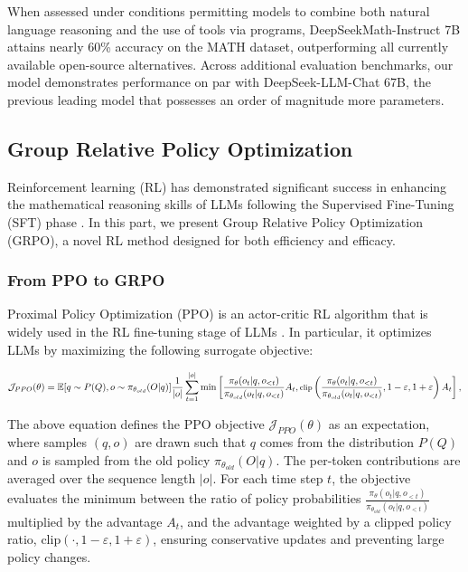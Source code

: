 \begin{itemize}[topsep=0pt]
\begin{itemize}[topsep=0pt]
When assessed under conditions permitting models to combine both natural language reasoning and the use of tools via programs, DeepSeekMath-Instruct 7B attains nearly 60\% accuracy on the MATH dataset, outperforming all currently available open-source alternatives. Across additional evaluation benchmarks, our model demonstrates performance on par with DeepSeek-LLM-Chat 67B, the previous leading model that possesses an order of magnitude more parameters.

\subsection{Group Relative Policy Optimization} Reinforcement learning (RL) has demonstrated significant success in enhancing the mathematical reasoning skills of LLMs following the Supervised Fine-Tuning (SFT) phase \citep{wang2023math,wizardmath}. In this part, we present Group Relative Policy Optimization (GRPO), a novel RL method designed for both efficiency and efficacy.

\subsubsection{From PPO to GRPO} Proximal Policy Optimization (PPO) \citep{schulman2017proximal} is an actor-critic RL algorithm that is widely used in the RL fine-tuning stage of LLMs \citep{ouyang2022training}. In particular, it optimizes LLMs by maximizing the following surrogate objective:

\begin{equation}
\footnotesize
    \mathcal{J}_{PPO}(\theta) = \mathbb{E}{[q \sim P(Q), o \sim \pi_{\theta_{old}}(O|q)]} \frac{1}{|o|} \sum_{t=1}^{|o|} \min \left[ \frac{\pi_\theta(o_{t} | q, o_{<t})}{\pi_{\theta_{old}}(o_{t} | q, o_{<t})} A_{t}, \text{clip} \left( \frac{\pi_\theta(o_{t} | q, o_{<t})}{\pi_{\theta_{old}}(o_{t} | q, o_{<t})}, 1 - \varepsilon, 1 + \varepsilon \right)  A_{t} \right] ,
\end{equation}

The above equation defines the PPO objective $\mathcal{J}_{PPO}(\theta)$ as an expectation, where samples $(q, o)$ are drawn such that $q$ comes from the distribution $P(Q)$ and $o$ is sampled from the old policy $\pi_{\theta_{old}}(O|q)$. The per-token contributions are averaged over the sequence length $|o|$. For each time step $t$, the objective evaluates the minimum between the ratio of policy probabilities $\frac{\pi_\theta(o_{t} | q, o_{<t})}{\pi_{\theta_{old}}(o_{t} | q, o_{<t})}$ multiplied by the advantage $A_t$, and the advantage weighted by a clipped policy ratio, $\text{clip}(\cdot, 1 - \varepsilon, 1 + \varepsilon)$, ensuring conservative updates and preventing large policy changes.


\end{itemize}
\end{itemize}
